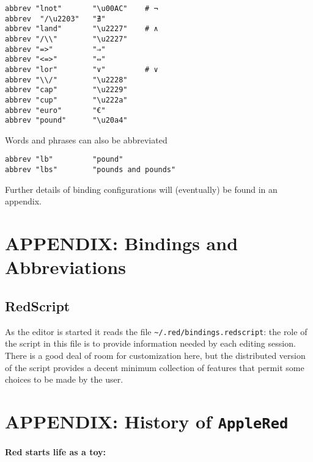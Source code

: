 \documentclass[11pt,a4paper]{article}
\begin{document}
\begin{verbatim}
abbrev "lnot"       "\u00AC"    # ¬
abbrev  "/\u2203"   "∄"
abbrev "land"       "\u2227"    # ∧
abbrev "/\\"        "\u2227" 
abbrev "=>"         "⇒" 
abbrev "<=>"        "⇔" 
abbrev "lor"        "∨"         # ∨
abbrev "\\/"        "\u2228"
abbrev "cap"        "\u2229" 
abbrev "cup"        "\u222a"  
abbrev "euro"       "€"  
abbrev "pound"      "\u20a4"
\end{verbatim}

Words and phrases can also be abbreviated

\begin{verbatim}
abbrev "lb"         "pound"
abbrev "lbs"        "pounds and pounds"
\end{verbatim}

Further details of binding configurations will (eventually) be found in
an appendix.

\newpage
\appendix
\hypertarget{appendix-bindings-and-abbreviations}{%
\section{APPENDIX: Bindings and
Abbreviations}\label{appendix-bindings-and-abbreviations}}

\hypertarget{redscript}{%
\subsection{RedScript}\label{redscript}}

As the editor is started it reads the file
\texttt{\textasciitilde{}/.red/bindings.redscript}: the role of the
script in this file is to provide information needed by each editing
session. There is a good deal of room for customization here, but the
distributed version of the script provides a decent minimum collection
of features that permit some choices to be made by the user.

\hypertarget{appendix-history-of-applered}{%
\section{\texorpdfstring{APPENDIX: History of
\texttt{AppleRed}}{APPENDIX: History of AppleRed}}\label{appendix-history-of-applered}}

\hypertarget{red-starts-life-as-a-toy}{%
\paragraph{Red starts life as a toy:}\label{red-starts-life-as-a-toy}}
\end{document}
